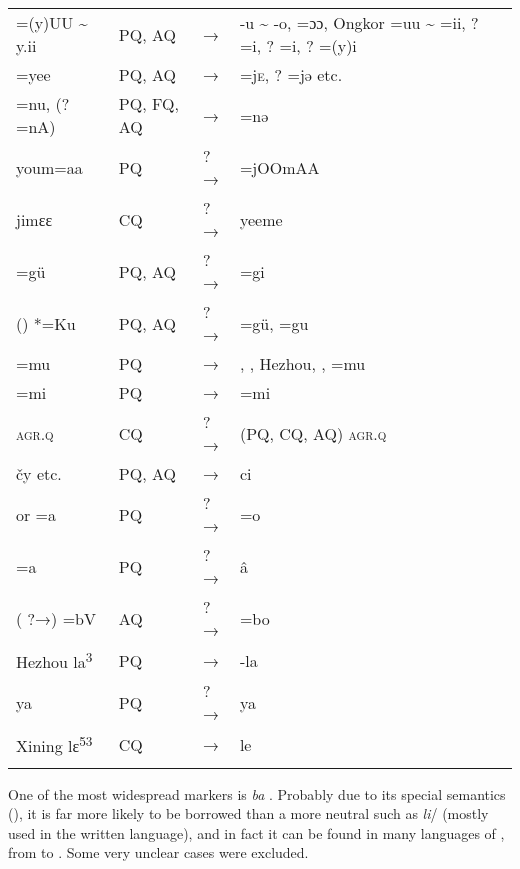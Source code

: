 \begin{table}
\begin{tabularx}{\textwidth}{QllQ}
 =(y)UU {\textasciitilde} y.ii & PQ, AQ & → &  -u {\textasciitilde} -o,  =ɔɔ, Ongkor  =uu {\textasciitilde} =ii, ? =i, ? =i, ? =(y)i\\
 =yee & PQ, AQ & → &  =j\textsc{e}, ? =jə etc.\\
 =nu, (?=nA) & PQ, FQ, AQ & → &  =nə\\
 youm=aa & PQ & ?→ &  =jOOmAA\\
 jimɛɛ & CQ & ?→ &  yeeme\\
 =gü & PQ, AQ & ?→ &  =gi\\
 () *=Ku & PQ, AQ & ?→ &  =gü,  =gu\\
 =mu & PQ & → & , , Hezhou, ,  =mu\\
 =mi & PQ & → &  =mi\\
 \textsc{agr.q} & CQ & ?→ &  (PQ, CQ, AQ) \textsc{agr.q}\\
 čy etc. & PQ, AQ & → &  ci\\
 or  =a & PQ & ?→ &  =o\\
 =a & PQ & ?→ &  â\\
( ?→)  =bV & AQ & ?→ &  =bo\\
Hezhou la\textsuperscript{3}  & PQ & → &  {}-la\\
 ya & PQ & ?→ &  ya\\
Xining  lɛ\textsuperscript{53}  & CQ & → &  le\\
\lspbottomrule
\end{tabularx}
\end{table}

One of the most widespread markers is  \textit{ba} . Probably due to its special semantics (), it is far more likely to be borrowed than a more neutral  such as  \textit{li}/ (mostly used in the written language), and in fact it can be found in many languages of , from  to . Some very unclear cases were excluded.

